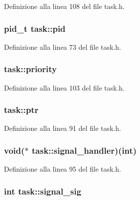 Definizione alla linea 108 del file task.\+h.

\hypertarget{structtask_ab56448ae42a75825ea923bd86648f3ae}{
\subsubsection[{pid}]{\setlength{\rightskip}{0pt plus 5cm}pid\+\_\+t task\+::pid}}\label{structtask_ab56448ae42a75825ea923bd86648f3ae}


Definizione alla linea 73 del file task.\+h.

\hypertarget{structtask_a9ab46b5a6e7c471f1fe32db13e6636a2}{
\subsubsection[{priority}]{ task\+::priority}}\label{structtask_a9ab46b5a6e7c471f1fe32db13e6636a2}


Definizione alla linea 103 del file task.\+h.

\hypertarget{structtask_afbc0623ab058e402e92ea084dc37ab6a}{
\subsubsection[{ptr}]{ task\+::ptr}}\label{structtask_afbc0623ab058e402e92ea084dc37ab6a}


Definizione alla linea 91 del file task.\+h.

\hypertarget{structtask_aea4c9382e5f4f148a0a74c0680729cf0}{
\subsubsection[{signal\+\_\+handler}]{\setlength{\rightskip}{0pt plus 5cm}void($\ast$ task\+::signal\+\_\+handler)(int)}}\label{structtask_aea4c9382e5f4f148a0a74c0680729cf0}


Definizione alla linea 95 del file task.\+h.

\hypertarget{structtask_a3d6991558f05258094bbef5c47073928}{
\subsubsection[{signal\+\_\+sig}]{\setlength{\rightskip}{0pt plus 5cm}int task\+::signal\+\_\+sig}}\label{structtask_a3d6991558f05258094bbef5c47073928}


